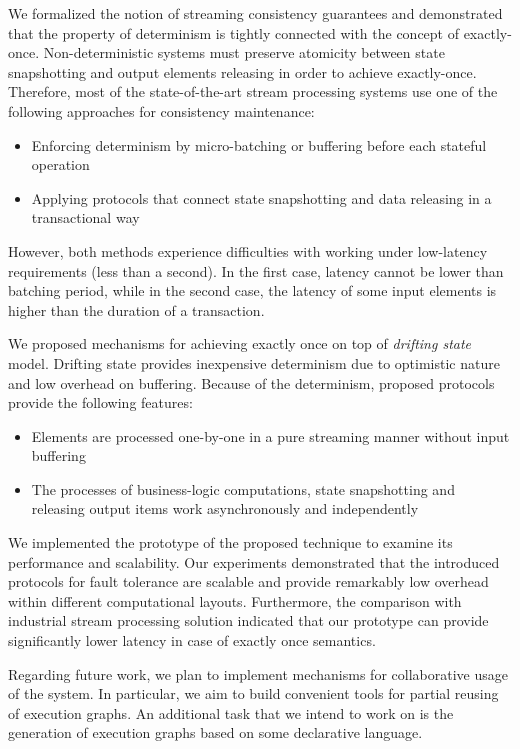 
\label {fs-conclusion-seciton}

We formalized the notion of streaming consistency guarantees and demonstrated that the property of determinism is tightly connected with the concept of exactly-once. Non-deterministic systems must preserve atomicity between state snapshotting and output elements releasing in order to achieve exactly-once. Therefore, most of the state-of-the-art stream processing systems use one of the following approaches for consistency maintenance: 
\begin{itemize}
    \item Enforcing determinism by micro-batching or buffering before each stateful operation
    \item Applying protocols that connect state snapshotting and data releasing in a transactional way
\end{itemize}

However, both methods experience difficulties with working under low-latency requirements (less than a second). In the first case, latency cannot be lower than batching period, while in the second case, the latency of some input elements is higher than the duration of a transaction.

We proposed mechanisms for achieving exactly once on top of {\em drifting state} model. Drifting state provides inexpensive determinism due to optimistic nature and low overhead on buffering. Because of the determinism, proposed protocols provide the following features:

\begin{itemize}
    \item Elements are processed one-by-one in a pure streaming manner without input buffering
    \item The processes of business-logic computations, state snapshotting and releasing output items work asynchronously and independently
\end{itemize}

We implemented the prototype of the proposed technique to examine its performance and scalability. Our experiments demonstrated that the introduced protocols for fault tolerance are scalable and provide remarkably low overhead within different computational layouts. Furthermore, the comparison with industrial stream processing solution indicated that our prototype can provide significantly lower latency in case of exactly once semantics.

Regarding future work, we plan to implement mechanisms for collaborative usage of the system. In particular, we aim to build convenient tools for partial reusing of execution graphs. An additional task that we intend to work on is the generation of execution graphs based on some declarative language.
